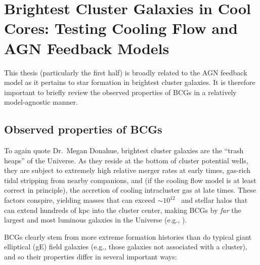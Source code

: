 


\section{Brightest Cluster Galaxies in Cool Cores: Testing Cooling Flow and AGN Feedback Models}


This thesis (particularly the first half) is broadly related to the AGN feedback model as it pertains to star formation in brightest cluster galaxies. 
It is therefore important to briefly review the observed properties of BCGs in a relatively model-agnostic 
manner.  






\subsection{Observed properties of BCGs}

To again quote Dr.~Megan Donahue, brightest cluster galaxies are the ``trash heaps'' of the Universe. 
As they reside at the bottom of cluster potential wells, they are subject to extremely high relative merger rates at early times, gas-rich tidal stripping from nearby companions, 
and (if the cooling flow model is at least correct in principle), the accretion of cooling intracluster gas 
at late times. These factors conspire, yielding masses that can exceed $\sim 10^{12}$ \Msol\ 
and stellar halos that can extend hundreds of kpc into the cluster center, making BCGs  by {\it far} the largest and most luminous galaxies in the Universe (e.g., \citealt{sarazin88}). 


BCGs clearly stem from more extreme formation histories than do typical giant elliptical (gE) field galaxies (e.g., those galaxies not associated with a cluster), 
and so their properties differ in several important ways: 


